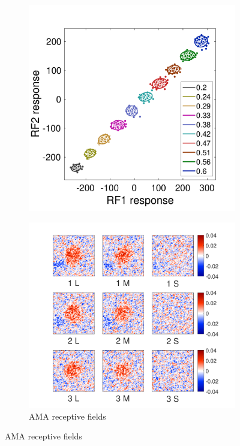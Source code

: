 \documentclass{jov}
\begin{document}
\begin{figure}
\begin{subfigure}[b]{0.31 \textwidth}
        \includegraphics[width=\textwidth, trim={0 3mm 0 15mm},clip]{../FiguresDraft5/Figure10/Figure10_b.pdf}
        \label{fig:case1RFResponse}
    \end{subfigure}
    \begin{subfigure}[b]{0.32 \textwidth}
	\caption{AMA receptive fields}
	\includegraphics[width=1.0\textwidth, trim={0.2cm -0.cm 0 0.3cm}]{../FiguresDraft5/Figure10/Figure10_c.pdf}

\end{subfigure}
\end{figure}
\end{document}
